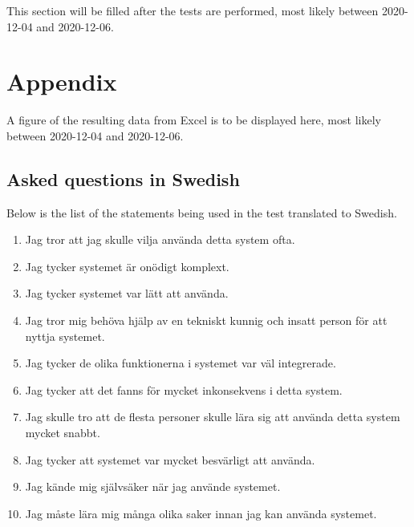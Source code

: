 \documentclass[12pt]{article}
\begin{document}
    This section will be filled after the tests are performed, most likely between 2020-12-04 and 2020-12-06.
    
    \section{Appendix}
    A figure of the resulting data from Excel is to be displayed here, most likely between 2020-12-04 and 2020-12-06.
    \subsection{Asked questions in Swedish}
    Below is the list of the statements being used in the test translated to Swedish. 
    \begin{enumerate}
        \item Jag tror att jag skulle vilja använda detta system ofta.
        \item Jag tycker systemet är onödigt komplext.
        \item Jag tycker systemet var lätt att använda.
        \item Jag tror mig behöva hjälp av en tekniskt kunnig och insatt person för att nyttja systemet. 
        \item Jag tycker de olika funktionerna i systemet var väl integrerade.
        \item Jag tycker att det fanns för mycket inkonsekvens i detta system.
        \item Jag skulle tro att de flesta personer skulle lära sig att använda detta system mycket snabbt.
        \item Jag tycker att systemet var mycket besvärligt att använda.
        \item Jag kände mig självsäker när jag använde systemet.
        \item Jag måste lära mig många olika saker innan jag kan använda systemet.
    \end{enumerate}

    
\end{document}
